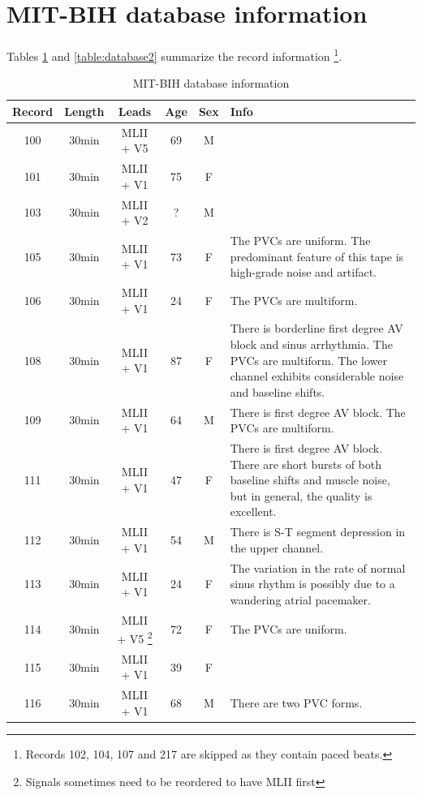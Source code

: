 \documentclass[a4paper,10pt,twoside]{article}
\begin{document}
\appendix

\section{MIT-BIH database information}
\label{section:database}
\paragraph{}Tables \ref{table:database} and \ref{table:database2} summarize the record information \footnote{Records 102, 104, 107 and 217 are skipped as they contain paced beats.}. 
\begin{table}
\centering
\caption{MIT-BIH database information}
\label{table:database}
 \begin{tabular}{c|c|c|c|c|p{14cm}} 
 \hline
 Record & Length & Leads & Age & Sex & Info \\
 \hline
 100 & 30min & MLII + V5 & 69 & M & \\
 101 & 30min & MLII + V1 & 75 & F & \\
 103 & 30min & MLII + V2 & ? & M & \\
 105 & 30min & MLII + V1 & 73 & F & The PVCs are uniform.  The predominant feature of this tape is high-grade noise and artifact.\\
 106 & 30min & MLII + V1 & 24 & F & The PVCs are multiform.\\
 108 & 30min & MLII + V1 & 87 & F & There is borderline first degree AV block and sinus arrhythmia. The PVCs are multiform. The lower channel exhibits considerable noise and baseline shifts.\\
 109 & 30min & MLII + V1 & 64 & M & There is first degree AV block.  The PVCs are multiform.\\
 111 & 30min & MLII + V1 & 47 & F & There is first degree AV block.  There are short bursts of both baseline shifts and muscle noise, but in general, the quality is excellent.\\
 112 & 30min & MLII + V1 & 54 & M & There is S-T segment depression in the upper channel.\\
 113 & 30min & MLII + V1 & 24 & F & The variation in the rate of normal sinus rhythm is possibly due to a wandering atrial pacemaker.\\
 114 & 30min & MLII + V5 \footnote{Signals sometimes need to be reordered to have MLII first} & 72 & F & The PVCs are uniform.\\
 115 & 30min & MLII + V1 & 39 & F & \\
 116 & 30min & MLII + V1 & 68 & M & There are two PVC forms.\\

\end{tabular}
\end{table}
\end{document}
